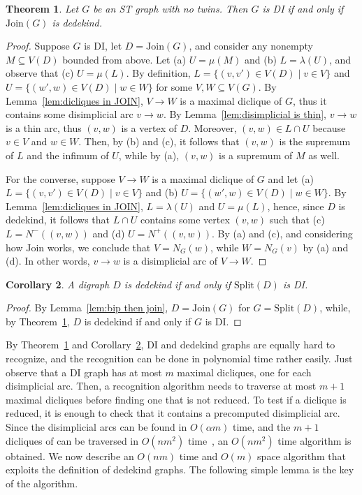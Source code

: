 \documentclass[a4paper,11pt]{article}
\newtheorem{theorem}{Theorem}
\newtheorem{corollary}[theorem]{Corollary}
\newcommand{\SPLIT}{\ensuremath{\mathrm{Split}}}
\newcommand{\JOIN}{\ensuremath{\mathrm{Join}}}
\begin{document}
\begin{theorem}\label{thm:DI characterization}
 Let $G$ be an ST graph with no twins.  Then $G$ is DI if and only if\/ $\JOIN(G)$ is dedekind.
\end{theorem}

\begin{proof}
  Suppose $G$ is DI, let $D = \JOIN(G)$, and consider any nonempty $M \subseteq V(D)$ bounded from above.  Let (a) $U = \mu(M)$ and (b) $L = \lambda(U)$, and observe that (c) $U = \mu(L)$.  By definition, $L = \{(v,v') \in V(D) \mid v \in V\}$ and $U = \{(w',w) \in V(D) \mid w \in W\}$ for some  $V, W \subseteq V(G)$.  By Lemma~\ref{lem:dicliques in JOIN}, $V \to W$ is a maximal diclique of $G$, thus it contains some disimplicial arc $v \to w$.  By Lemma~\ref{lem:disimplicial is thin}, $v \to w$ is a thin arc, thus $(v,w)$ is a vertex of $D$.  Moreover, $(v,w) \in L \cap U$ because $v \in V$ and $w \in W$.  Then, by (b) and (c), it follows that $(v,w)$ is the supremum of $L$ and the infimum of $U$, while by (a), $(v,w)$ is a supremum of $M$ as well.
 
  For the converse, suppose $V \to W$ is a maximal diclique of $G$ and let (a) $L = \{(v,v') \in V(D) \mid v \in V\}$ and (b) $U = \{(w',w) \in V(D) \mid w \in W\}$.  By Lemma~\ref{lem:dicliques in JOIN}, $L = \lambda(U)$ and $U = \mu(L)$, hence, since $D$ is dedekind, it follows that $L \cap U$ contains some vertex $(v,w)$ such that (c) $L = N^-((v,w))$ and (d) $U = N^+((v,w))$.  By (a) and (c), and considering how $\JOIN$ works, we conclude that $V = N_G(w)$, while $W = N_G(v)$ by (a) and (d).  In other words, $v \to w$ is a disimplicial arc of $V \to W$. 
\end{proof}

\begin{corollary}\label{cor:dedekind characterization}
  A digraph $D$ is dedekind if and only if\/ $\SPLIT(D)$ is DI.
\end{corollary}

\begin{proof}
  By Lemma~\ref{lem:bip then join}, $D = \JOIN(G)$ for $G = \SPLIT(D)$, while, by Theorem~\ref{thm:DI characterization}, $D$ is dedekind if and only if $G$ is DI.  
\end{proof}

By Theorem~\ref{thm:DI characterization} and Corollary~\ref{cor:dedekind characterization}, DI and dedekind graphs are equally hard to recognize, and the recognition can be done in polynomial time rather easily.  Just observe that a DI graph has at most $m$ maximal dicliques, one for each disimplicial arc.  Then, a recognition algorithm needs to traverse at most $m+1$ maximal dicliques before finding one that is not reduced.  To test if a diclique is reduced, it is enough to check that it contains a precomputed disimplicial arc.  Since the disimplicial arcs can be found in $O(\alpha m)$ time, and the $m+1$ dicliques of can be traversed in $O(nm^2)$ time~\cite{DiasFigueiredoSzwarcfiterDAM2007}, an $O(nm^2)$ time algorithm is obtained.  We now describe an $O(nm)$ time and $O(m)$ space algorithm that exploits the definition of dedekind graphs.  The following simple lemma is the key of the algorithm.
\end{document}
